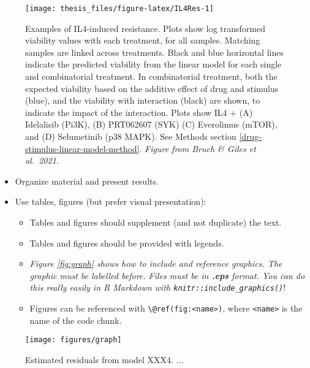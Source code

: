 \documentclass[11pt, a4paper, twosided]{book}
\begin{document}
\begin{figure}

{\centering \texttt{[image: thesis\_files/figure-latex/IL4Res-1]} 

}

\caption{Examples of IL4-induced resistance. Plots show log transformed viability values with each treatment, for all samples. Matching samples are linked across treatments. Black and blue horizontal lines indicate the predicted viability from the linear model for each single and combinatorial treatment. In combinatorial treatment, both the expected viability based on the additive effect of drug and stimulus (blue), and the viability with interaction (black) are shown, to indicate the impact of the interaction. Plots show IL4 + (A) Idelalisib (Pi3K), (B) PRT062607 (SYK) (C) Everolimus (mTOR), and (D) Selumetinib (p38 MAPK). See Methods section \ref{drug-stimulus-linear-model-method}. \emph{Figure from Bruch \& Giles et al.~2021.}}\label{fig:IL4Res}
\end{figure}
\begin{itemize}
\item
  Organize material and present results.
\item
  Use tables, figures (but prefer visual presentation):
  \begin{itemize}
  \item
    Tables and figures should supplement (and not duplicate) the text.
  \item
    Tables and figures should be provided with legends.
  \item
    \emph{Figure \ref{fig:graph} shows how to include and reference graphics.
    The graphic must be labelled before. Files must be in \textbf{.eps} format. You
    can do this really easily in R Markdown with \texttt{knitr::include\_graphics()}}!
  \item
    Figures can be referenced with \texttt{\textbackslash{}@ref(fig:\textless{}name\textgreater{})}, where \texttt{\textless{}name\textgreater{}} is the
    name of the code chunk.
  \end{itemize}
\end{itemize}
\begin{figure}

{\centering \texttt{[image: figures/graph]} 

}

\caption{Estimated residuals from model XXX4. ...}\label{fig:graph4}
\end{figure}
\end{document}
